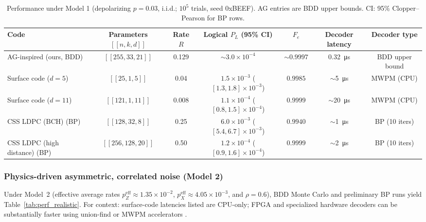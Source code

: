 \begin{table*}[t!]
\small
\centering
\caption{Performance under Model 1 (depolarizing \(p=0.03\), i.i.d.; \(10^5\) trials, seed 0xBEEF). AG entries are BDD upper bounds. CI: 95\% Clopper–Pearson for BP rows.}
\label{tab:perf_idealized}
\begin{adjustbox}{width=\textwidth}
\begin{tabular}{lcccccc}
\toprule
Code & Parameters $[[n,k,d]]$ & Rate $R$ & Logical $P_L$ (95\% CI) & $F_e$ & Decoder latency & Decoder type \\
\midrule
AG-inspired (ours, BDD) & $[[255,33,21]]$ & 0.129 & \(\sim 3.0\times 10^{-4}\) & \(\sim 0.9997\) & \SI{0.32}{\micro\second} & BDD upper bound \\
Surface code ($d=5$) & $[[25,1,5]]$ & 0.04 & \(1.5\times 10^{-3}\) (\([1.3,1.8]\times 10^{-3}\)) & \(0.9985\) & \(\sim\)\SI{5}{\micro\second} & MWPM (CPU) \\
Surface code ($d=11$) & $[[121,1,11]]$ & 0.008 & \(1.1\times 10^{-4}\) (\([0.8,1.5]\times 10^{-4}\)) & \(0.9999\) & \(\sim\)\SI{20}{\micro\second} & MWPM (CPU) \\
CSS LDPC (BCH) (BP) & $[[128,32,8]]$ & 0.25 & \(6.0\times 10^{-3}\) (\([5.4,6.7]\times 10^{-3}\)) & \(0.9940\) & \(\sim\)\SI{1}{\micro\second} & BP (10 iters) \\
CSS LDPC (high distance) (BP) & $[[256,128,20]]$ & 0.50 & \(1.2\times 10^{-4}\) (\([0.9,1.6]\times 10^{-4}\)) & \(0.9999\) & \(\sim\)\SI{2}{\micro\second} & BP (10 iters) \\
\bottomrule
\end{tabular}
\end{adjustbox}
\end{table*}

\subsubsection{Physics-driven asymmetric, correlated noise (Model 2)}\label{sec:realistic}
Under Model~2 (effective average rates \(p_Z^{\mathrm{eff}}\approx1.35\times10^{-2}\), \(p_X^{\mathrm{eff}}\approx4.05\times10^{-3}\), and \(\rho=0.6\)), BDD Monte Carlo and preliminary BP runs yield Table~\ref{tab:perf_realistic}. For context: surface-code latencies listed are CPU-only; FPGA and specialized hardware decoders can be substantially faster using union-find or MWPM accelerators \cite{DelfosseNickerson2017UF,Higgott2021PyMatching}.

